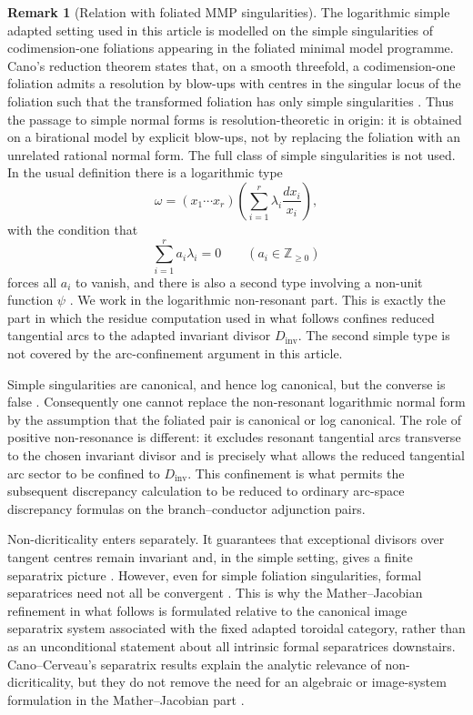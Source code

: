 \documentclass[11pt]{amsart}
\numberwithin{equation}{section}
\theoremstyle{plain}
\theoremstyle{definition}
\newtheorem{Remark}[Theorem]{Remark}
\newcommand{\Dinv}{D_{\mathrm{inv}}}
\newcommand{\bZ}{\mathbb Z}
\begin{document}
\begin{Remark}[Relation with foliated MMP singularities]
The logarithmic simple adapted setting used in this article is modelled on the
simple singularities of codimension-one foliations appearing in the foliated
minimal model programme.  Cano's reduction theorem states that, on a smooth
threefold, a codimension-one foliation admits a resolution by blow-ups with
centres in the singular locus of the foliation such that the transformed
foliation has only simple singularities \cite{Can04}.  Thus the passage to
simple normal forms is resolution-theoretic in origin: it is obtained on a
birational model by explicit blow-ups, not by replacing the foliation with an
unrelated rational normal form.
The full class of simple singularities is not used.  In the usual
definition there is a logarithmic type
\[
\omega=(x_1\cdots x_r)\left(\sum_{i=1}^r
\lambda_i\frac{dx_i}{x_i}\right),
\]
with the condition that
\[
\sum_{i=1}^r a_i\lambda_i=0
\qquad (a_i\in\bZ_{\geq 0})
\]
forces all \(a_i\) to vanish, and there is also a second type involving a
non-unit function \(\psi\) \cite[Definition~2.13]{Spicer}.  We work in the logarithmic non-resonant part.  This is exactly the part in
which the residue computation used in what follows confines reduced tangential arcs to
the adapted invariant divisor \(\Dinv\).  The second simple type is not
covered by the arc-confinement argument in this article.

Simple singularities are canonical, and hence log canonical, but the converse
is false \cite[Lemma~2.15 and Example~2.16]{Spicer}.  Consequently one cannot
replace the non-resonant logarithmic normal form by the assumption that the
foliated pair is canonical or log canonical.  The role of positive
non-resonance is different: it excludes resonant tangential arcs
transverse to the chosen invariant divisor and is precisely what allows the
reduced tangential arc sector to be confined to \(\Dinv\).  This
confinement is what permits the subsequent discrepancy calculation to be
reduced to ordinary arc-space discrepancy formulas on the branch--conductor
adjunction pairs.

Non-dicriticality enters separately.  It guarantees that exceptional divisors
over tangent centres remain invariant and, in the simple setting, gives a
finite separatrix picture \cite[Definition~2.17--Example~2.22]{Spicer}.
However, even for simple foliation singularities, formal separatrices need
not all be convergent \cite[p.~8]{Spicer}.  This is why the
Mather--Jacobian refinement in what follows is formulated relative to the canonical
image separatrix system associated with the fixed adapted toroidal category,
rather than as an unconditional statement about all intrinsic formal
separatrices downstairs.  Cano--Cerveau's separatrix results explain the
analytic relevance of non-dicriticality, but they do not remove the need for
an algebraic or image-system formulation in the Mather--Jacobian part
\cite{CC92}.
\end{Remark}
\end{document}
